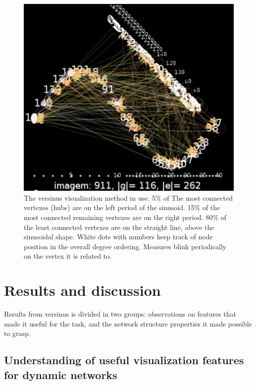 \documentclass[%
 aip,
 jmp,%
 amsmath,amssymb,
 reprint,%
]{revtex4-1}
\begin{document}
\begin{figure}[h!]
    \begin{center}
        \includegraphics[scale=.25]{figs/versinus_}
        \caption{The versinus visualization method in use. 5\% of The most connected vertexes (hubs) are on the left period of the sinusoid. 15\% of the most connected remaining vertexes are on the right period. 80\% of the least connected vertexes are on the straight line, above the sinusoidal shape. White dots with numbers keep track of node position in the overall degree ordering. Measures blink periodically on the vertex it is related to.}
        \label{fig:versinus}
    \end{center}
\end{figure}

\section{Results and discussion}\label{res}
Results from versinus is divided in two groups:
observations on features that made it useful for the task,
and the network structure properties it made possible to grasp.

\subsection{Understanding of useful visualization features for dynamic networks}
\end{document}

